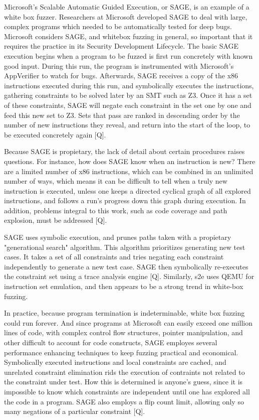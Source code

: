 \documentclass[11pt,expanded,copyright]{fsuthesis}
\begin{document}
Microsoft's Scalable Automatic Guided Execution, or SAGE, is an example of a white box fuzzer. Researchers at Microsoft developed SAGE to deal with large, complex programs which needed to be automatically tested for deep bugs. Microsoft considers SAGE, and whitebox fuzzing in general, so important that it requires the practice in its Security Development Lifecycle. The basic SAGE execution begins when a program to be fuzzed is first run concretely with known good input. During this run, the program is instrumented with Microsoft's AppVerifier to watch for bugs. Afterwards, SAGE receives a copy of the x86 instructions executed during this run, and symbolically executes the instructions, gathering constraints to be solved later by an SMT such as Z3. Once it has a set of these constraints, SAGE will negate each constraint in the set one by one and feed this new set to Z3. Sets that pass are ranked in descending order by the number of new instructions they reveal, and return into the start of the loop, to be executed concretely again [Q].

Because SAGE is propietary, the lack of detail about certain procedures raises questions. For instance, how does SAGE know when an instruction is new? There are a limited number of x86 instructions, which can be combined in an unlimited number of ways, which means it can be difficult to tell when a truly new instruction is executed, unless one keeps a directed cyclical graph of all explored instructions, and follows a run's progress down this graph during execution. In addition, problems integral to this work, such as code coverage and path explosion, must be addressed [Q].

SAGE uses symbolic execution, and prunes paths taken with a propietary "generational search" algorithm. This algorithm prioritizes generating new test cases. It takes a set of all constraints and tries negating each constraint independently to generate a new test case. SAGE then symbolically re-executes the constraint set using a trace analysis engine [Q]. Similarly, s2e uses QEMU for instruction set emulation, and then appears to be a strong trend in white-box fuzzing.

In practice, because program termination is indeterminable, white box fuzzing could run forever. And since programs at Microsoft can easily exceed one million lines of code, with complex control flow structures, pointer manipulation, and other difficult to account for code constructs, SAGE employes several performance enhancing techniques to keep fuzzing practical and economical. Symbolically executed instructions and local constraints are cached, and unrelated constraint elimination rids the execution of contraints not related to the constraint under test. How this is determined is anyone's guess, since it is impossible to know which constraints are independent until one has explored all the code in a program. SAGE also employs a flip count limit, allowing only so many negations of a particular constraint [Q]. 
\end{document}
